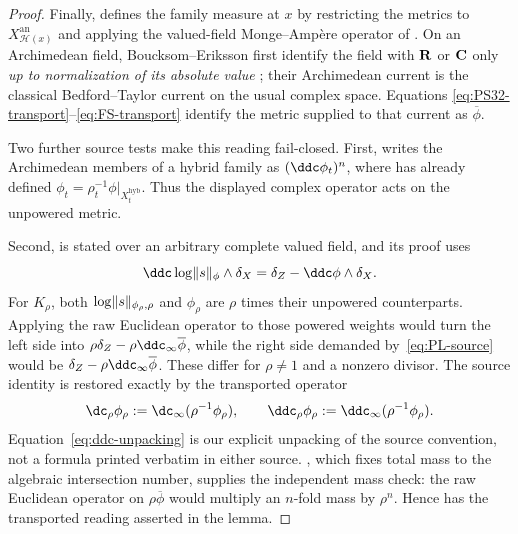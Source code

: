 \begin{proof}
Finally, \cite[Definition~4.8]{PS23Hybrid} defines the family measure at $x$
by restricting the metrics to $X_{\mathcal H(x)}^{\mathrm{an}}$ and applying the
valued-field Monge--Amp\`ere operator of
\cite[Section~4.1]{PS23Hybrid}.  On an Archimedean field,
Boucksom--Eriksson first identify the field with $\mathbf R$ or $\mathbf C$ only
\emph{up to normalization of its absolute value}
\cite[Section~1.1]{BE21}; their Archimedean current is the classical
Bedford--Taylor current on the usual complex space.  Equations
\eqref{eq:PS32-transport}--\eqref{eq:FS-transport} identify the metric
supplied to that current as $\overline\phi$.

Two further source tests make this reading fail-closed.  First,
\cite[Theorem~4.11]{PS23Hybrid} writes the Archimedean members of a hybrid
family as $(\ddc\phi_t)^n$, where \cite[Proposition~3.2]{PS23Hybrid} has
already defined $\phi_t=\rho_t^{-1}\phi|_{X_t^{\mathrm{hyb}}}$.  Thus the
displayed complex operator acts on the unpowered metric.

Second, \cite[Theorem~8.14]{BE21} is stated over an arbitrary complete valued
field, and its proof uses
\begin{equation}
 \ddc\log\norm{s}_{\phi}\wedge\delta_X
 =\delta_Z-\ddc\phi\wedge\delta_X.
\label{eq:PL-source}
\end{equation}
For $K_\rho$, both
$\log\lVert s\rVert_{\phi_\rho,\rho}$ and $\phi_\rho$ are $\rho$ times their
unpowered counterparts.  Applying the raw Euclidean operator to those
powered weights would turn the left side into
$\rho\delta_Z-\rho\ddc_\infty\overline\phi$, while the right side demanded
by~\eqref{eq:PL-source} would be
$\delta_Z-\rho\ddc_\infty\overline\phi$.  These differ for
$\rho\ne1$ and a nonzero divisor.  The source identity is restored exactly
by the transported operator
\begin{equation}
 \dc_\rho\phi_\rho:=\dc_\infty(\rho^{-1}\phi_\rho),
 \qquad
 \ddc_\rho\phi_\rho:=\ddc_\infty(\rho^{-1}\phi_\rho).
\label{eq:ddc-unpacking}
\end{equation}
Equation~\eqref{eq:ddc-unpacking} is our explicit unpacking of the source
convention, not a formula printed verbatim in either source.
\cite[Proposition~8.3(ii)]{BE21}, which fixes total mass to the
algebraic intersection number, supplies the independent mass check: the raw
Euclidean operator on $\rho\overline\phi$ would multiply an $n$-fold mass
by $\rho^n$.  Hence \cite[Definition~4.8]{PS23Hybrid} has the transported
reading asserted in the lemma.
\end{proof}

